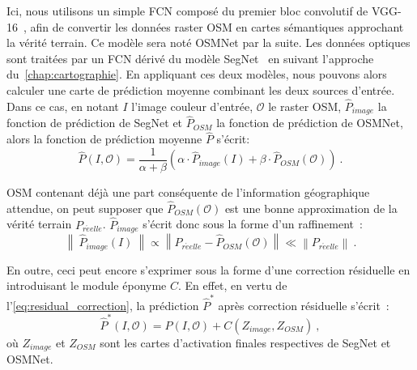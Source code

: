 Ici, nous utilisons un simple \gls{FCN} composé du premier bloc convolutif de \gls{VGG-16}~\cite{simonyan_very_2015}, afin de convertir les données raster \gls{OSM} en cartes sémantiques approchant la vérité terrain. Ce modèle sera noté OSMNet par la suite. Les données optiques sont traitées par un \gls{FCN} dérivé du modèle SegNet~\cite{badrinarayanan_segnet_2017} en suivant l'approche du~\cref{chap:cartographie}. En appliquant ces deux modèles, nous pouvons alors calculer une carte de prédiction moyenne combinant les deux sources d'entrée. Dans ce cas, en notant $I$ l'image couleur d'entrée, $\mathcal{O}$ le raster \gls{OSM}, $\hat{P}_\mathit{image}$ la fonction de prédiction de SegNet et $\hat{P}_\mathit{OSM}$ la fonction de prédiction de OSMNet, alors la fonction de prédiction moyenne $\hat{P}$ s'écrit:
\begin{equation}
\hat{P}(I, \mathcal{O}) = \frac{1}{\alpha + \beta} (\alpha \cdot \hat{P}_\mathit{image}(I) + \beta \cdot \hat{P}_\mathit{OSM}(\mathcal{O}))~.
\end{equation}

\gls{OSM} contenant déjà une part conséquente de l'information géographique attendue, on peut supposer que $\hat{P}_\mathit{OSM}(\mathcal{O})$ est une bonne approximation de la vérité terrain $P_\mathit{r\acute{e}elle}$. $\hat{P}_\mathit{image}$ s'écrit donc sous la forme d'un raffinement~\cite{lin_refinenet_2017}:
\begin{equation}
\left\lVert~\hat{P}_\mathit{image}(I)~\right\rVert \propto \left\lVert P_\mathit{r\acute{e}elle} - \hat{P}_\mathit{OSM}(\mathcal{O}) \right\rVert \ll \left\lVert P_\mathit{r\acute{e}elle} \right\rVert~.
\end{equation}

En outre, ceci peut encore s'exprimer sous la forme d'une correction résiduelle en introduisant le module éponyme $C$. En effet, en vertu de l'\cref{eq:residual_correction}, la prédiction $\hat{P}^*$ après correction résiduelle s'écrit~:
\begin{equation}
\hat{P}^*(I, \mathcal{O}) = \hat{P}(I, \mathcal{O}) + C\left(Z_\mathit{image}, Z_\mathit{OSM}\right)~,
\end{equation}
où $Z_\mathit{image}$ et $Z_\mathit{OSM}$ sont les cartes d'activation finales respectives de SegNet et OSMNet.

